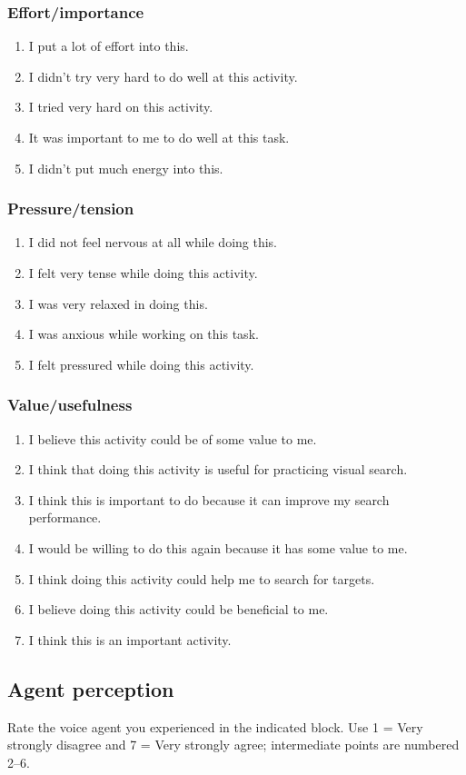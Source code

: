 \subsubsection*{Effort/importance}\label{imi2}
\begin{enumerate}
\item I put a lot of effort into this.
\item I didn't try very hard to do well at this activity.
\item I tried very hard on this activity.
\item It was important to me to do well at this task.
\item I didn't put much energy into this.
\end{enumerate}
\subsubsection*{Pressure/tension}\label{imi3}
\begin{enumerate}
\item I did not feel nervous at all while doing this.
\item I felt very tense while doing this activity.
\item I was very relaxed in doing this.
\item I was anxious while working on this task.
\item I felt pressured while doing this activity.
\end{enumerate}
\subsubsection*{Value/usefulness}\label{imi4}
\begin{enumerate}
\item I believe this activity could be of some value to me.
\item I think that doing this activity is useful for practicing visual search.
\item I think this is important to do because it can improve my search performance.
\item I would be willing to do this again because it has some value to me.
\item I think doing this activity could help me to search for targets.
\item I believe doing this activity could be beneficial to me.
\item I think this is an important activity.
\end{enumerate}
\subsection{Agent perception}
Rate the voice agent you experienced in the indicated block. Use 1 = Very strongly disagree and 7 = Very strongly agree; intermediate points are numbered 2--6.
